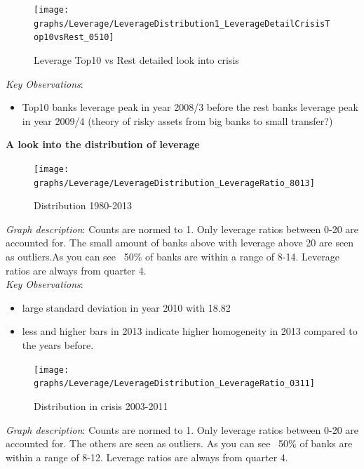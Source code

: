 \documentclass[12pt, a4paper]{article} %
\begin{document}
\begin{figure}[hbtp]
\centering
\caption{Leverage Top10 vs Rest detailed look into crisis}
\texttt{[image: graphs/Leverage/LeverageDistribution1\_LeverageDetailCrisisTop10vsRest\_0510]}
\end{figure}


\noindent \textit{Key Observations}:
\begin{itemize}
\item Top10 banks leverage peak in year 2008/3 before the rest banks leverage peak in year 2009/4 (theory of risky assets from big banks to small transfer?) 
\end{itemize}
\fi
\pagebreak

\textbf{A look into the distribution of leverage}\\



\begin{figure}[hbtp]
\centering
\caption{Distribution 1980-2013}
\texttt{[image: graphs/Leverage/LeverageDistribution\_LeverageRatio\_8013]}
\end{figure}

\noindent \textit{Graph description}: Counts are normed to 1. Only leverage ratios between 0-20 are accounted for. The small amount of banks above with leverage above 20 are seen as outliers.As you can see ~50$\%$ of banks are within a range of 8-14. Leverage ratios are always from quarter 4.
\\

\noindent \textit{Key Observations}:
\begin{itemize}
\item large standard deviation in year 2010 with 18.82
\item less and higher bars in 2013 indicate higher homogeneity in 2013 compared to the years before.
\end{itemize}

\pagebreak


\begin{figure}[hbtp]
\centering
\caption{Distribution in crisis 2003-2011}
\texttt{[image: graphs/Leverage/LeverageDistribution\_LeverageRatio\_0311]}
\end{figure}

\noindent \textit{Graph description}: Counts are normed to 1. Only leverage ratios between 0-20 are accounted for. The others are seen as outliers. As you can see ~50$\%$ of banks are within a range of 8-12. Leverage ratios are always from quarter 4.
\end{document}
